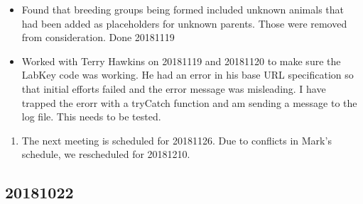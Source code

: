\documentclass[
]{article}
\providecommand{\tightlist}{%
  \setlength{\itemsep}{0pt}\setlength{\parskip}{0pt}}
\begin{document}
\begin{itemize}
\tightlist
\item
  Found that breeding groups being formed included unknown animals that
  had been added as placeholders for unknown parents. Those were removed
  from consideration. Done 20181119
\item
  Worked with Terry Hawkins on 20181119 and 20181120 to make sure the
  LabKey code was working. He had an error in his base URL specification
  so that initial efforts failed and the error message was misleading. I
  have trapped the erorr with a tryCatch function and am sending a
  message to the log file. This needs to be tested.
\end{itemize}

\begin{enumerate}
\def\labelenumi{\arabic{enumi}.}
\setcounter{enumi}{10}
\tightlist
\item
  The next meeting is scheduled for 20181126. Due to conflicts in Mark's
  schedule, we rescheduled for 20181210.
\end{enumerate}

\hypertarget{section-19}{%
\subsection{20181022}\label{section-19}}
\end{document}
